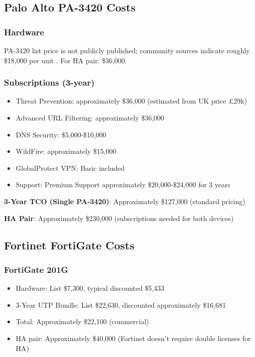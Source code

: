 \documentclass[12pt]{article}
\begin{document}
\subsection{Palo Alto PA-3420 Costs}

\subsubsection{Hardware}
PA-3420 list price is not publicly published; community sources indicate roughly \$18,000 per unit \cite{redditpalopricing}. For HA pair: \$36,000.

\subsubsection{Subscriptions (3-year)}
\begin{itemize}
    \item Threat Prevention: approximately \$36,000 (estimated from UK price £29k) \cite{exnpanuk2024}
    \item Advanced URL Filtering: approximately \$36,000 \cite{exnpanuk2024}
    \item DNS Security: \$5,000-\$10,000
    \item WildFire: approximately \$15,000
    \item GlobalProtect VPN: Basic included
    \item Support: Premium Support approximately \$20,000-\$24,000 for 3 years \cite{paloaltopanext}
\end{itemize}

\textbf{3-Year TCO (Single PA-3420)}: Approximately \$127,000 (standard pricing)

\textbf{HA Pair}: Approximately \$230,000 (subscriptions needed for both devices)

\subsection{Fortinet FortiGate Costs}

\subsubsection{FortiGate 201G}
\begin{itemize}
    \item Hardware: List \$7,300, typical discounted \$5,433 \cite{fortigate201gavfirewalls}
    \item 3-Year UTP Bundle: List \$22,630, discounted approximately \$16,681 \cite{fortinetbundles2024}
    \item Total: Approximately \$22,100 (commercial)
    \item HA pair: Approximately \$40,000 (Fortinet doesn't require double licenses for HA)
\end{itemize}
\end{document}
